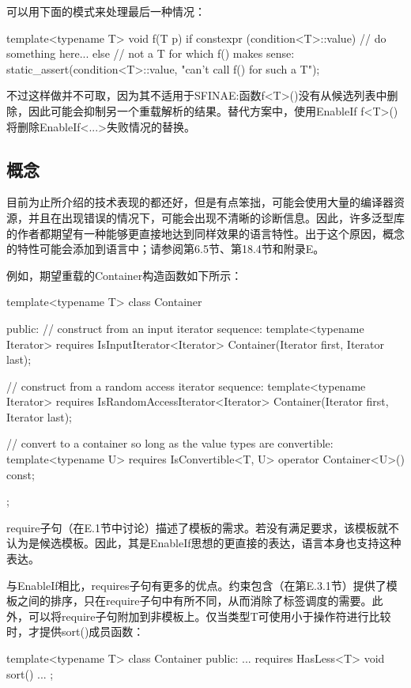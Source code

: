 可以用下面的模式来处理最后一种情况：

\begin{cpp}
template<typename T>
void f(T p) {
	if constexpr (condition<T>::value) {
		// do something here...
	}
	else {
		// not a T for which f() makes sense:
		static_assert(condition<T>::value, "can't call f() for such a T");
	}
}
\end{cpp}

不过这样做并不可取，因为其不适用于SFINAE:函数f<T>()没有从候选列表中删除，因此可能会抑制另一个重载解析的结果。替代方案中，使用EnableIf f<T>()将删除EnableIf<...>失败情况的替换。

\subsection{概念}

目前为止所介绍的技术表现的都还好，但是有点笨拙，可能会使用大量的编译器资源，并且在出现错误的情况下，可能会出现不清晰的诊断信息。因此，许多泛型库的作者都期望有一种能够更直接地达到同样效果的语言特性。出于这个原因，概念的特性可能会添加到语言中；请参阅第6.5节、第18.4节和附录E。

例如，期望重载的Container构造函数如下所示：

\begin{cpp}
template<typename T>
class Container {
	public:
	// construct from an input iterator sequence:
	template<typename Iterator>
	requires IsInputIterator<Iterator>
	Container(Iterator first, Iterator last);
	
	// construct from a random access iterator sequence:
	template<typename Iterator>
	requires IsRandomAccessIterator<Iterator>
	Container(Iterator first, Iterator last);
	
	// convert to a container so long as the value types are convertible:
	template<typename U>
	requires IsConvertible<T, U>
	operator Container<U>() const;
};
\end{cpp}

require子句（在E.1节中讨论）描述了模板的需求。若没有满足要求，该模板就不认为是候选模板。因此，其是EnableIf思想的更直接的表达，语言本身也支持这种表达。

与EnableIf相比，requires子句有更多的优点。约束包含（在第E.3.1节）提供了模板之间的排序，只在require子句中有所不同，从而消除了标签调度的需要。此外，可以将require子句附加到非模板上。仅当类型T可使用小于操作符进行比较时，才提供sort()成员函数：

\begin{cpp}
template<typename T>
class Container {
	public:
	...
	requires HasLess<T>
	void sort() {
		...
	}
};
\end{cpp}





